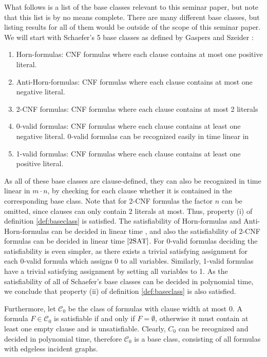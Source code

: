 \documentclass[11pt,a4paper]{article}
\theoremstyle{definition}
\theoremstyle{proposition}
\begin{document}
What follows is a list of the base classes relevant to this seminar paper, but note that this list is by no means complete. There are many different base classes, but listing results for all of them would be outside of the scope of this seminar paper. We will start with Schaefer's 5 base classes as defined by Gaspers and Szeider \cite[p.290f]{Gaspers2012}:
\begin{enumerate}
\item Horn-formulas: CNF formulas where each clause contains at most one positive literal. 
\item Anti-Horn-formulas: CNF formulas where each clause contains at most one negative literal. 
\item 2-CNF formulas: CNF formulas where each clause contains at most 2 literals
\item 0-valid formulas: CNF formulas where each clause contains at least one negative literal. 0-valid formulas can be recognized easily in time linear in 
\item 1-valid formulas: CNF formulas where each clause contains at least one positive literal. 
\end{enumerate}
As all of these base classes are clause-defined, they can also be recognized in time linear in $m \cdot n$, by checking for each clause whether it is contained in the corresponding base class. Note that for 2-CNF formulas the factor $n$ can be omitted, since clauses can only contain 2 literals at most. Thus, property (i) of definition \ref{def:baseclass} is satisfied. The satisfiability of Horn-formulas and Anti-Horn-formulas can be decided in linear time \cite{HornSAT}, and also the satisfiability of 2-CNF formulas can be decided in linear time $\cite{2SAT}$. For 0-valid formulas deciding the satisfiability is even simpler, as there exists a trivial satisfying assignment for each 0-valid formula which assigns 0 to all variables. Similarly, 1-valid formulas have a trivial satisfying assignment by setting all variables to 1. As the satisfiability of all of Schaefer's base classes can be decided in polynomial time, we conclude that property (ii) of definition \ref{def:baseclass} is also satisfied. 

Furthermore, let $\mathcal{C}_0$ be the class of formulas with clause width at most 0. A formula $F \in \mathcal{C}_0$ is satisfiable if and only if $F = \emptyset$, otherwise it must contain at least one empty clause and is unsatisfiable. Clearly, $C_0$ can be recognized and decided in polynomial time, therefore $\mathcal{C}_0$ is a base class, consisting of all formulas with edgeless incident graphs.  
\end{document}

